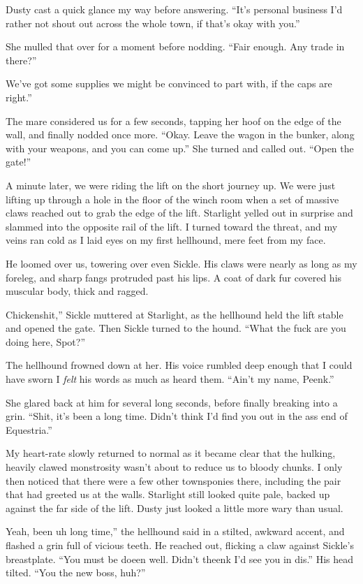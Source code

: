 Dusty cast a quick glance my way before answering. “It’s personal business I’d rather not shout out across the whole town, if that’s okay with you.”

She mulled that over for a moment before nodding. “Fair enough. Any trade in there?”

\leavevmode{}We’ve got some supplies we might be convinced to part with, if the caps are right.”

The mare considered us for a few seconds, tapping her hoof on the edge of the wall, and finally nodded once more. “Okay. Leave the wagon in the bunker, along with your weapons, and you can come up.” She turned and called out. “Open the gate!”

A minute later, we were riding the lift on the short journey up. We were just lifting up through a hole in the floor of the winch room when a set of massive claws reached out to grab the edge of the lift. Starlight yelled out in surprise and slammed into the opposite rail of the lift. I turned toward the threat, and my veins ran cold as I laid eyes on my first hellhound, mere feet from my face.

He loomed over us, towering over even Sickle. His claws were nearly as long as my foreleg, and sharp fangs protruded past his lips. A coat of dark fur covered his muscular body, thick and ragged.

\leavevmode{}Chickenshit,” Sickle muttered at Starlight, as the hellhound held the lift stable and opened the gate. Then Sickle turned to the hound. “What the fuck are you doing here, Spot?”

The hellhound frowned down at her. His voice rumbled deep enough that I could have sworn I \textit{felt} his words as much as heard them. “Ain’t my name, Peenk.”

She glared back at him for several long seconds, before finally breaking into a grin. “Shit, it’s been a long time. Didn’t think I’d find you out in the ass end of Equestria.”

My heart-rate slowly returned to normal as it became clear that the hulking, heavily clawed monstrosity wasn’t about to reduce us to bloody chunks. I only then noticed that there were a few other townsponies there, including the pair that had greeted us at the walls. Starlight still looked quite pale, backed up against the far side of the lift. Dusty just looked a little more wary than usual.

\leavevmode{}Yeah, been uh long time,” the hellhound said in a stilted, awkward accent, and flashed a grin full of vicious teeth. He reached out, flicking a claw against Sickle’s breastplate. “You must be doeen well. Didn’t theenk I’d see you in dis.” His head tilted. “You the new boss, huh?”

